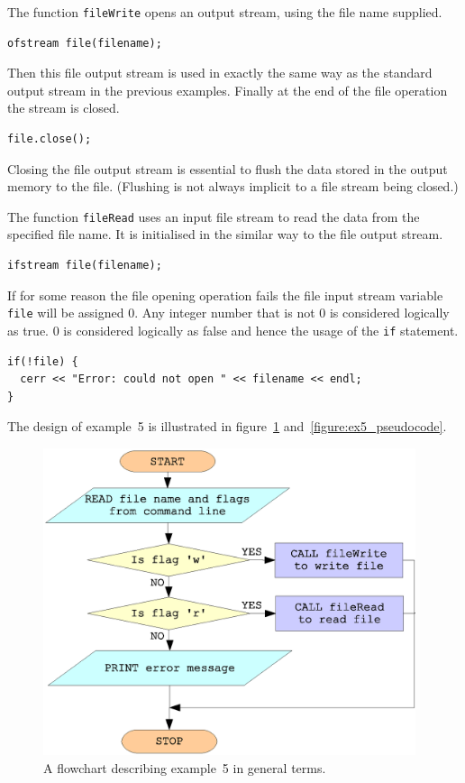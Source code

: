 \documentclass[11pt,a4paper]{scrartcl}
\begin{document}
The function \texttt{fileWrite} opens an output stream, using the file
name supplied.
\begin{verbatim}
ofstream file(filename);
\end{verbatim}
Then this file output stream is used in exactly the same way as the
standard output stream in the previous examples.  Finally at the end of the
file operation the stream is closed.
\begin{verbatim}
file.close();
\end{verbatim}
Closing the file output stream is essential to flush the data stored
in the output memory to the file.  (Flushing is not always implicit to
a file stream being closed.)

The function \texttt{fileRead} uses an input file stream to read the
data from the specified file name.  It is initialised in the similar
way to the file output stream.
\begin{verbatim}
ifstream file(filename);
\end{verbatim}
If for some reason the file opening operation fails the file input
stream variable \texttt{file} will be assigned 0.  Any integer number
that is not 0 is considered logically as true.  0 is considered
logically as false and hence the usage of the \texttt{if} statement.
\begin{verbatim}
if(!file) {
  cerr << "Error: could not open " << filename << endl;
}
\end{verbatim}
The design of example~5 is illustrated in figure~\ref{figure:ex5_flowchart} and~\ref{figure:ex5_pseudocode}.

\begin{figure}[h!!]
\begin{center}
\includegraphics[height=9cm]{figures/flowchart.eps}
\caption{A flowchart describing example~5 in general terms.
\label{figure:ex5_flowchart}}
\end{center}
\end{figure}
\end{document}
